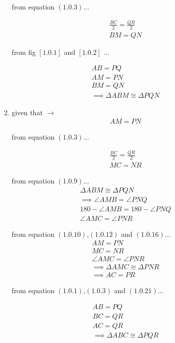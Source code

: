\begin{enumerate}
\begin{enumerate}
		from equation $\left(1.0.3\right)$...
	
		\begin{align}
			\frac{BC}{2} = \frac{QR}{2} \\
			BM = QN
		\end{align}

		from fig $\left[1.0.1\right]$ and $\left[1.0.2\right]$ ...

		\begin{align}
	 		AB = PQ\\
	 		AM = PN\\
	 		BM = QN\\
			\implies  \Delta ABM \cong \Delta PQN
		\end{align}
	
		\item
		given that $\to$\\
		\begin{align}
			AM = PN
		\end{align}
	
		from equation $\left(1.0.3\right)$...
	
		\begin{align}
			\frac{BC}{2} = \frac{QR}{2} \\
			MC = NR
		\end{align}
	
	
		from equation $\left(1.0.9\right)$...
		\begin{align}
			\Delta ABM \cong \Delta PQN 
			\\
			\implies \angle AMB = \angle PNQ
			\\
			180 - \angle AMB = 180 -  \angle PNQ
			\\
			\angle AMC = \angle PNR
		\end{align}
	
		from equation $\left(1.0.10\right)$,$\left(1.0.12\right)$ and $\left(1.0.16\right)$...
		\begin{align}
			AM = PN
			\\
			MC = NR
			\\
			\angle AMC = \angle PNR
			\\
			\implies  \Delta AMC \cong \Delta PNR
			\\
			\implies AC = PR
		\end{align}
	
		from equation $\left(1.0.1\right)$,$\left(1.0.3\right)$ and $\left(1.0.21\right)$...
		
		\begin{align}
			AB = PQ\\
			BC = QR\\
			AC = QR\\
			\implies  \Delta ABC \cong \Delta PQR
		\end{align}
	
	\end{enumerate}
	
\end{enumerate}
